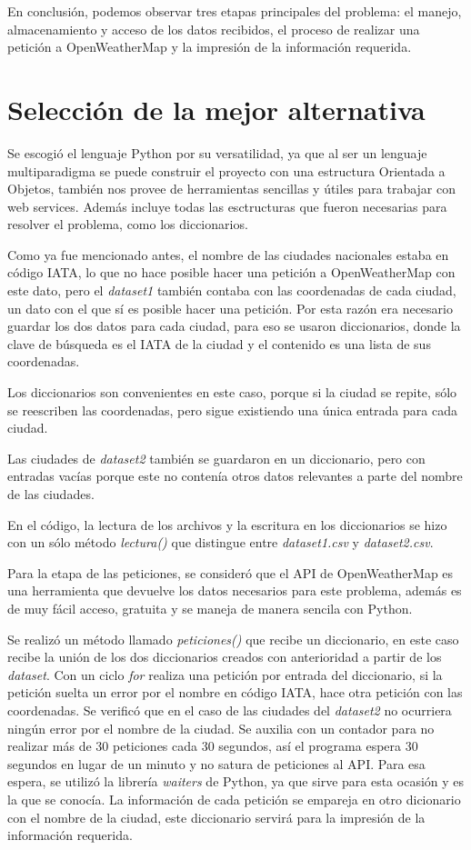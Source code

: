 \documentclass[]{article}
\begin{document}
En conclusión, podemos observar tres etapas principales del problema: 
el manejo, almacenamiento y acceso de los datos recibidos, el proceso de 
realizar una petición a OpenWeatherMap y la impresión de la información 
requerida.

\section{Selección de la mejor alternativa}
Se escogió el lenguaje Python por su versatilidad, ya que al ser un lenguaje 
multiparadigma se puede construir el proyecto con una estructura Orientada 
a Objetos, también nos provee de herramientas sencillas y útiles para 
trabajar con web services. Además incluye todas las esctructuras que fueron 
necesarias para resolver el problema, como los diccionarios.

Como ya fue mencionado antes, el nombre de las ciudades nacionales estaba 
en código IATA, lo que no hace posible hacer una petición a 
OpenWeatherMap con este dato, pero el \emph{dataset1} también contaba 
con las coordenadas de cada ciudad, un dato con el que sí es posible hacer 
una petición. Por esta razón era necesario guardar los dos datos para cada 
ciudad, para eso se usaron diccionarios, donde la clave de búsqueda es el 
IATA de la ciudad y el contenido es una lista de sus coordenadas.

Los diccionarios son convenientes en este caso, porque si la ciudad se repite, 
sólo se reescriben las coordenadas, pero sigue existiendo una única entrada 
para cada ciudad.

Las ciudades de \emph{dataset2} también se guardaron en un diccionario, 
pero con entradas vacías porque este no contenía otros datos relevantes a 
parte del nombre de las ciudades.

En el código, la lectura de los archivos y la escritura en los diccionarios se 
hizo con un sólo método \emph{lectura()} que distingue entre
\emph{dataset1.csv} y \emph{dataset2.csv}.

Para la etapa de las peticiones, se consideró que el API de OpenWeatherMap 
es una herramienta que devuelve los datos necesarios para este problema, 
además es de muy fácil acceso, gratuita y se maneja de manera sencila con 
Python.

Se realizó un método llamado \emph{peticiones()} que recibe un diccionario, 
en este caso recibe la unión de los dos diccionarios creados con anterioridad 
a partir de los \emph{dataset}. Con un ciclo \emph{for} realiza una petición 
por entrada del diccionario, si la petición suelta un error por el nombre en 
código IATA, hace otra petición con las coordenadas. Se verificó que en el 
caso de las ciudades del \emph{dataset2} no ocurriera ningún error por el 
nombre de la ciudad. Se auxilia con un contador para no realizar más de 30 
peticiones cada 30 segundos, así el programa espera 30 segundos en lugar 
de un minuto y no satura de peticiones al API. Para esa espera, se utilizó la 
librería \emph{waiters} de Python, ya que sirve para esta ocasión y es la que 
se conocía. La información de cada petición se empareja en otro dicionario 
con el nombre de la ciudad, este diccionario servirá para la impresión de la 
información requerida.
\end{document}
